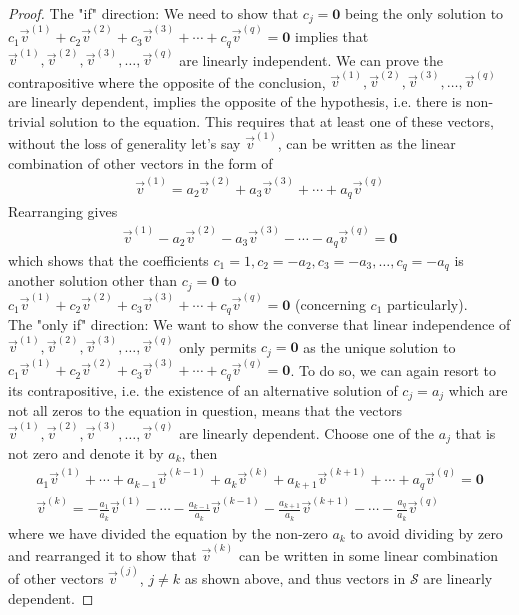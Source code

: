 \begin{proof}
The "if" direction: We need to show that $c_j = \textbf{0}$ being the only solution to $c_1\vec{v}^{(1)} + c_2\vec{v}^{(2)} + c_3\vec{v}^{(3)} + \cdots + c_q\vec{v}^{(q)} = \textbf{0}$ implies that $\vec{v}^{(1)}, \vec{v}^{(2)}, \vec{v}^{(3)}, \ldots, \vec{v}^{(q)}$ are linearly independent. We can prove the contrapositive where the opposite of the conclusion, $\vec{v}^{(1)}, \vec{v}^{(2)}, \vec{v}^{(3)}, \ldots, \vec{v}^{(q)}$ are linearly dependent, implies the opposite of the hypothesis, i.e. there is non-trivial solution to the equation. This requires that at least one of these vectors, without the loss of generality let's say $\vec{v}^{(1)}$, can be written as the linear combination of other vectors in the form of
\begin{align*}
\vec{v}^{(1)} = a_2\vec{v}^{(2)} + a_3\vec{v}^{(3)} + \cdots + a_q\vec{v}^{(q)}
\end{align*}
Rearranging gives 
\begin{align*}
\vec{v}^{(1)} - a_2\vec{v}^{(2)} - a_3\vec{v}^{(3)} - \cdots - a_q\vec{v}^{(q)} = \textbf{0}
\end{align*}
which shows that the coefficients $c_1 = 1, c_2 = -a_2, c_3 = -a_3, \ldots, c_q = -a_q$ is another solution other than $c_j = \textbf{0}$ to $c_1\vec{v}^{(1)} + c_2\vec{v}^{(2)} + c_3\vec{v}^{(3)} + \cdots + c_q\vec{v}^{(q)} = \textbf{0}$ (concerning $c_1$ particularly). \\
The "only if" direction: We want to show the converse that linear independence of $\vec{v}^{(1)}, \vec{v}^{(2)}, \vec{v}^{(3)}, \ldots, \vec{v}^{(q)}$ only permits $c_j = \textbf{0}$ as the unique solution to $c_1\vec{v}^{(1)} + c_2\vec{v}^{(2)} + c_3\vec{v}^{(3)} + \cdots + c_q\vec{v}^{(q)} = \textbf{0}$. To do so, we can again resort to its contrapositive, i.e. the existence of an alternative solution of $c_j = a_j$ which are not all zeros to the equation in question, means that the vectors $\vec{v}^{(1)}, \vec{v}^{(2)}, \vec{v}^{(3)}, \ldots, \vec{v}^{(q)}$ are linearly dependent. Choose one of the $a_j$ that is not zero and denote it by $a_k$, then
\begin{align*}
a_1\vec{v}^{(1)} + \cdots + a_{k-1}\vec{v}^{(k-1)} + a_k\vec{v}^{(k)} + a_{k+1}\vec{v}^{(k+1)} + \cdots + a_q\vec{v}^{(q)} = \textbf{0} \\
\vec{v}^{(k)} = -\frac{a_1}{a_k}\vec{v}^{(1)} - \cdots - \frac{a_{k-1}}{a_k}\vec{v}^{(k-1)} - \frac{a_{k+1}}{a_k}\vec{v}^{(k+1)} - \cdots - \frac{a_q}{a_k}\vec{v}^{(q)} 
\end{align*}
where we have divided the equation by the non-zero $a_k$ to avoid dividing by zero and rearranged it to show that $\vec{v}^{(k)}$ can be written in some linear combination of other vectors $\vec{v}^{(j)}$, $j \neq k$ as shown above, and thus vectors in $\mathcal{S}$ are linearly dependent. 
\end{proof}
